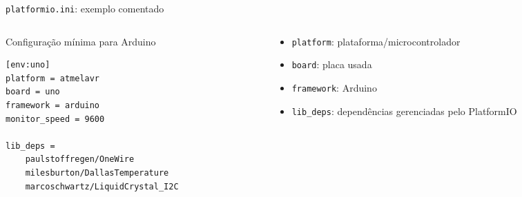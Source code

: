 \documentclass[aspectratio=169]{beamer}
\begin{document}
\begin{frame}[fragile]{\texttt{platformio.ini}: exemplo comentado}
    \begin{columns}
        \begin{column}{.5\textwidth}   
            \begin{block}{Configuração mínima para Arduino}
                \begin{verbatim}
[env:uno]
platform = atmelavr
board = uno
framework = arduino
monitor_speed = 9600

lib_deps =
    paulstoffregen/OneWire
    milesburton/DallasTemperature
    marcoschwartz/LiquidCrystal_I2C
                \end{verbatim}
            \end{block}
        \end{column}
        \begin{column}{.5\textwidth}
            \begin{itemize}
                \item \texttt{platform}: plataforma/microcontrolador
                \item \texttt{board}: placa usada
                \item \texttt{framework}: Arduino
                \item \texttt{lib\_deps}: dependências gerenciadas pelo PlatformIO
            \end{itemize}
        \end{column}
    \end{columns}
    \href{https://docs.platformio.org/en/latest/projectconf/index.html}{}
\end{frame}
\end{document}
